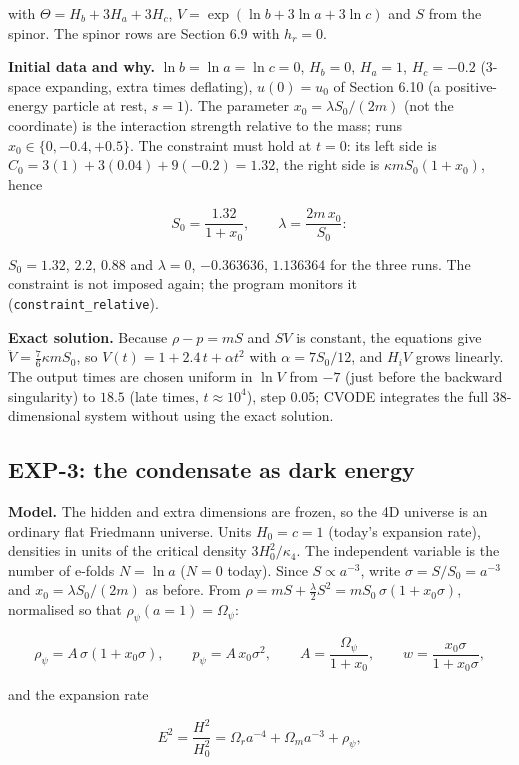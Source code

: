 \documentclass[11pt]{article}
\begin{document}
with $\Theta=H_b+3H_a+3H_c$, $V=\exp(\ln b+3\ln a+3\ln c)$ and $S$ from the spinor. The spinor rows are Section 6.9 with $h_r=0$.

\textbf{Initial data and why.} $\ln b=\ln a=\ln c=0$, $H_b=0$, $H_a=1$, $H_c=-0.2$ (3-space expanding, extra times deflating), $u(0)=u_0$ of Section 6.10 (a positive-energy particle at rest, $s=1$). The parameter $x_0=\lambda S_0/(2m)$ (not the coordinate) is the interaction strength relative to the mass; runs $x_0\in\{0,-0.4,+0.5\}$. The constraint must hold at $t=0$: its left side is $C_0=3(1)+3(0.04)+9(-0.2)=1.32$, the right side is $\kappa mS_0(1+x_0)$, hence

\[
S_0=\frac{1.32}{1+x_0},\qquad \lambda=\frac{2m\,x_0}{S_0}:
\]

$S_0=1.32$, $2.2$, $0.88$ and $\lambda=0$, $-0.363636$, $1.136364$ for the three runs. The constraint is not imposed again; the program monitors it (\texttt{constrai\allowbreak{}nt\_relat\allowbreak{}ive}).

\textbf{Exact solution.} Because $\rho-p=mS$ and $SV$ is constant, the equations give $\ddot V=\frac76\kappa mS_0$, so $V(t)=1+2.4\,t+\alpha t^2$ with $\alpha=7S_0/12$, and $H_iV$ grows linearly. The output times are chosen uniform in $\ln V$ from $-7$ (just before the backward singularity) to $18.5$ (late times, $t\approx10^4$), step 0.05; CVODE integrates the full 38-dimensional system without using the exact solution.

\subsection{EXP-3: the condensate as dark energy}

\textbf{Model.} The hidden and extra dimensions are frozen, so the 4D universe is an ordinary flat Friedmann universe. Units $H_0=c=1$ (today's expansion rate), densities in units of the critical density $3H_0^2/\kappa_4$. The independent variable is the number of e-folds $N=\ln a$ ($N=0$ today). Since $S\propto a^{-3}$, write $\sigma=S/S_0=a^{-3}$ and $x_0=\lambda S_0/(2m)$ as before. From $\rho=mS+\frac{\lambda}{2}S^2=mS_0\,\sigma(1+x_0\sigma)$, normalised so that $\rho_\psi(a=1)=\Omega_\psi$:

\[
\rho_\psi=A\,\sigma(1+x_0\sigma),\qquad p_\psi=A\,x_0\sigma^2,\qquad A=\frac{\Omega_\psi}{1+x_0},\qquad w=\frac{x_0\sigma}{1+x_0\sigma},
\]

and the expansion rate

\[
E^2=\frac{H^2}{H_0^2}=\Omega_ra^{-4}+\Omega_ma^{-3}+\rho_\psi,
\]
\end{document}
